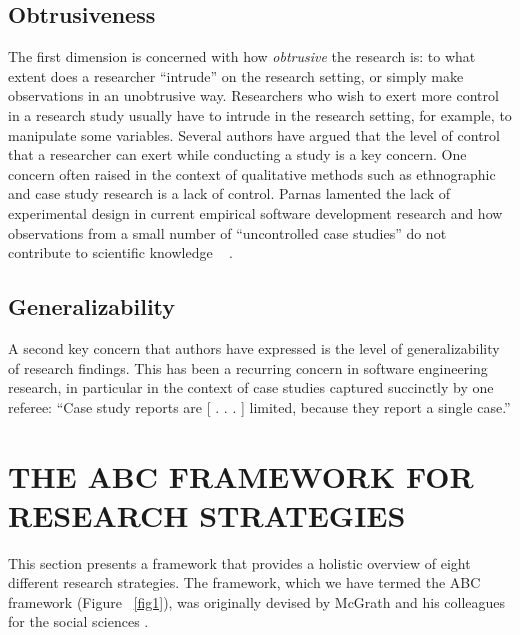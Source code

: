 \documentclass[runningheads]{llncs}
\begin{document}
\subsection{Obtrusiveness}
The first dimension is concerned with how \emph{obtrusive} the research is: to what extent does a researcher “intrude” on the research setting, or simply make observations in an unobtrusive way. Researchers who wish to exert more control in a research study usually have to intrude in the research setting, for example, to manipulate some variables. Several authors have
argued that the level of control that a researcher can exert while conducting a study is a key concern. One concern often raised in the context of qualitative methods
such as ethnographic and case study research is a lack of control. Parnas lamented the lack of
experimental design in current empirical software development research and how observations
from a small number of “uncontrolled case studies” do not contribute to scientific knowledge ~\cite{ref_article15} .

\subsection{Generalizability}
A second key concern that authors have expressed is the level of generalizability of research findings. This has been a recurring concern in software engineering research, in particular in the context of case studies captured succinctly by one referee: “Case study reports are [ . . . ] limited, because they report a single case.”

\section{THE ABC FRAMEWORK FOR RESEARCH STRATEGIES}
\label{section3}
This section presents a framework that provides a holistic overview of eight different research
strategies. The framework, which we have termed the ABC framework (Figure ~\ref{fig1}), was originally
devised by McGrath and his colleagues for the social sciences \cite{ref_article1,ref_article2,ref_article3,ref_article4} .
\end{document}
